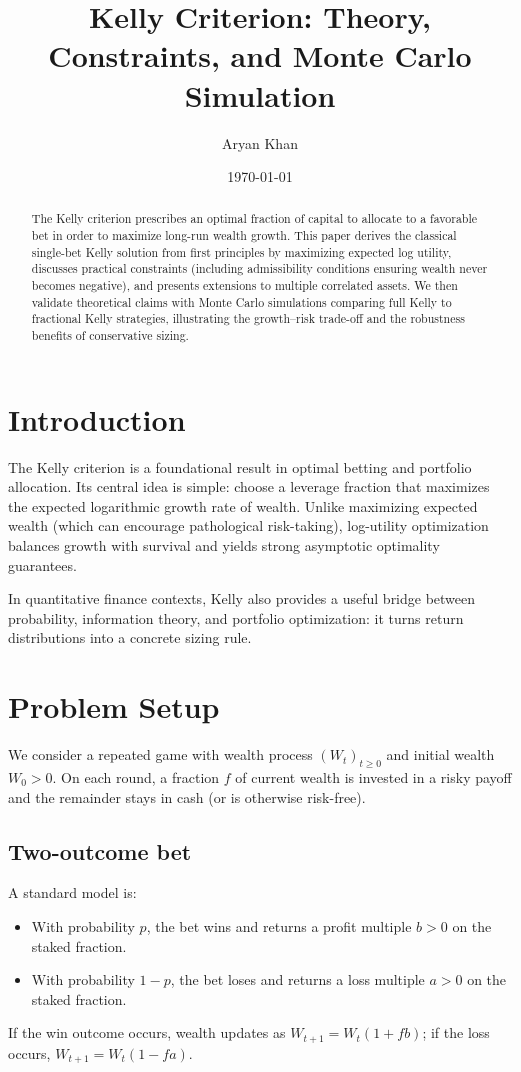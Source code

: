 \documentclass[11pt]{article}
\title{Kelly Criterion: Theory, Constraints, and Monte Carlo Simulation}
\author{Aryan Khan}
\date{\today}
\theoremstyle{plain}
\theoremstyle{definition}
\theoremstyle{remark}
\newcommand{\1}{\mathbf{1}}
\begin{document}
\maketitle
\tableofcontents
\newpage

\begin{abstract}
The Kelly criterion prescribes an optimal fraction of capital to allocate to a favorable bet in order to maximize long-run wealth growth. This paper derives the classical single-bet Kelly solution from first principles by maximizing expected log utility, discusses practical constraints (including admissibility conditions ensuring wealth never becomes negative), and presents extensions to multiple correlated assets. We then validate theoretical claims with Monte Carlo simulations comparing full Kelly to fractional Kelly strategies, illustrating the growth--risk trade-off and the robustness benefits of conservative sizing.
\end{abstract}

\section{Introduction}
The Kelly criterion is a foundational result in optimal betting and portfolio allocation. Its central idea is simple: choose a leverage fraction that maximizes the expected logarithmic growth rate of wealth. Unlike maximizing expected wealth (which can encourage pathological risk-taking), log-utility optimization balances growth with survival and yields strong asymptotic optimality guarantees.

In quantitative finance contexts, Kelly also provides a useful bridge between probability, information theory, and portfolio optimization: it turns return distributions into a concrete sizing rule.

\section{Problem Setup}
We consider a repeated game with wealth process $(W_t)_{t\ge 0}$ and initial wealth $W_0>0$. On each round, a fraction $f$ of current wealth is invested in a risky payoff and the remainder stays in cash (or is otherwise risk-free).

\subsection{Two-outcome bet}
A standard model is:
\begin{itemize}
\item With probability $p$, the bet wins and returns a profit multiple $b>0$ on the staked fraction.
\item With probability $1-p$, the bet loses and returns a loss multiple $a>0$ on the staked fraction.
\end{itemize}
If the win outcome occurs, wealth updates as $W_{t+1}=W_t(1+fb)$; if the loss occurs, $W_{t+1}=W_t(1-fa)$.
\end{document}
